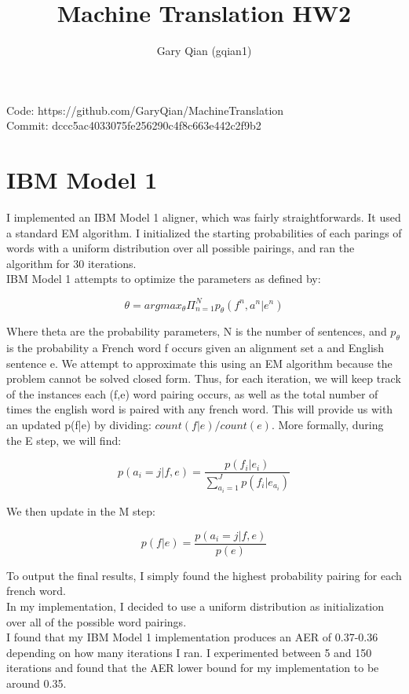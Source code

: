 \documentclass{article}
\begin{document}
\title{Machine Translation HW2}
\author{Gary Qian (gqian1)}
\maketitle
$\ $\\
Code: https://github.com/GaryQian/MachineTranslation\\
Commit: dccc5ac4033075fe256290c4f8c663e442c2f9b2

\section{IBM Model 1}

I implemented an IBM Model 1 aligner, which was fairly straightforwards. It used a standard EM algorithm. I initialized the starting probabilities of each parings of words with a uniform distribution over all possible pairings, and ran the algorithm for 30 iterations.\\

IBM Model 1 attempts to optimize the parameters as defined by:

\[
\theta = argmax_\theta \Pi^N_{n=1}p_\theta (f^n, a^n | e^n)
\]

Where theta are the probability parameters, N is the number of sentences, and $p_\theta$ is the probability a French word f occurs given an alignment set a and English sentence e. We attempt to approximate this using an EM algorithm because the problem cannot be solved closed form. Thus, for each iteration, we will keep track of the instances each (f,e) word pairing occurs, as well as the total number of times the english word is paired with any french word. This will provide us with an updated p(f|e) by dividing: $count(f|e) / count(e)$. More formally, during the E step, we will find:

\[
p(a_i = j|f,e) = \frac{p(f_i|e_i)}{\sum^J_{a_i=1}p(f_i|e_{a_i})}
\]

We then update in the M step:

\[
p(f|e) = \frac{p(a_i = j|f,e)}{p(e)}
\]

To output the final results, I simply found the highest probability pairing for each french word.\\ 

In my implementation, I decided to use a uniform distribution as initialization over all of the possible word pairings.\\

I found that my IBM Model 1 implementation produces an AER of 0.37-0.36 depending on how many iterations I ran. I experimented between 5 and 150 iterations and found that the AER lower bound for my implementation to be around 0.35.
\end{document}
